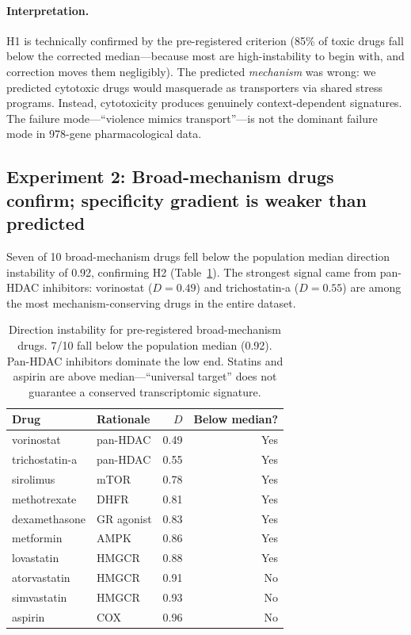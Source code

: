\documentclass{article}
\begin{document}
\paragraph{Interpretation.}
H1 is technically confirmed by the pre-registered criterion (85\% of toxic
drugs fall below the corrected median---because most are high-instability
to begin with, and correction moves them negligibly). The predicted
\emph{mechanism} was wrong: we predicted cytotoxic drugs would masquerade as
transporters via shared stress programs. Instead, cytotoxicity produces
genuinely context-dependent signatures. The failure mode---``violence mimics
transport''---is not the dominant failure mode in 978-gene pharmacological data.

\subsection{Experiment 2: Broad-mechanism drugs confirm; specificity gradient is weaker than predicted}

Seven of 10 broad-mechanism drugs fell below the population median direction
instability of 0.92, confirming H2 (Table~\ref{tab:broad}). The strongest
signal came from pan-HDAC inhibitors: vorinostat ($D = 0.49$) and
trichostatin-a ($D = 0.55$) are among the most mechanism-conserving drugs
in the entire dataset.

\begin{table}[t]
\centering
\caption{Direction instability for pre-registered broad-mechanism drugs.
7/10 fall below the population median (0.92). Pan-HDAC inhibitors dominate
the low end. Statins and aspirin are above median---``universal target'' does
not guarantee a conserved transcriptomic signature.}
\label{tab:broad}
\small
\begin{tabular}{llrr}
\toprule
Drug & Rationale & $D$ & Below median? \\
\midrule
vorinostat & pan-HDAC & 0.49 & Yes \\
trichostatin-a & pan-HDAC & 0.55 & Yes \\
sirolimus & mTOR & 0.78 & Yes \\
methotrexate & DHFR & 0.81 & Yes \\
dexamethasone & GR agonist & 0.83 & Yes \\
metformin & AMPK & 0.86 & Yes \\
lovastatin & HMGCR & 0.88 & Yes \\
atorvastatin & HMGCR & 0.91 & No \\
simvastatin & HMGCR & 0.93 & No \\
aspirin & COX & 0.96 & No \\
\bottomrule
\end{tabular}
\end{table}
\end{document}
